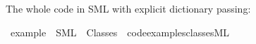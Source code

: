 \begin{isabellebody}
\begin{isamarkuptext}
  \noindent The whole code in SML with explicit dictionary passing:%
\end{isamarkuptext}%
\isamarkuptrue%
\isamarkupfalse%
\ example\ \ SML\ \ Classes\ \ {\isachardoublequoteopen}code{\isacharunderscore}examples{\isacharslash}classes{\isachardot}ML{\isachardoublequoteclose}%
\begin{isamarkuptext}%
%
\end{isamarkuptext}%
\isamarkuptrue%
%
\isadelimtheory
%
\endisadelimtheory
%
\isatagtheory
{}\isamarkupfalse%
%
\endisatagtheory
{\isafoldtheory}%
%
\isadelimtheory
%
\endisadelimtheory
\isanewline
\end{isabellebody}%

